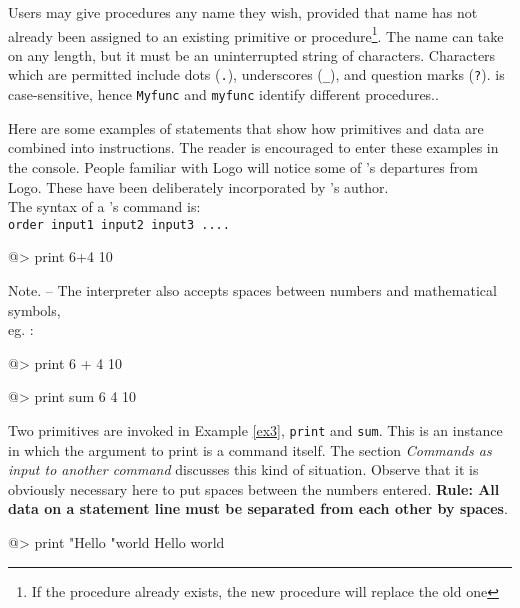 Users may give procedures any name they wish, provided that name has not already been assigned to an existing primitive or procedure\footnote{If the procedure already exists, the new procedure will replace the old one}. The name can take on any length, but it must be an uninterrupted string of characters.  Characters which are permitted include dots (\verb+.+), underscores (\verb+_+), and question marks (\verb+?+). \squirrel is case-sensitive, hence \verb+Myfunc+ and \verb+myfunc+ identify different procedures.. 
 
Here are some examples of \squirrel statements that show how primitives and data are combined into instructions. The reader is encouraged to enter these examples in the console.  People familiar with Logo will notice some of \squirrel's departures from Logo.  These have been deliberately incorporated by \squirrel's author.\\

The syntax of a \squirrel's command is:\\

{\tt order input1 input2 input3 ....}\\

\begin{verbatimtab}
@> print 6+4
10
\end{verbatimtab}

Note. -- The interpreter also accepts spaces between numbers and mathematical symbols,\\ eg. :

\begin{verbatimtab}
@> print 6 + 4
10
\end{verbatimtab}

\begin{verbatimtab}
@> print sum 6 4
10
\end{verbatimtab}
 
Two primitives are invoked in Example \ref{ex3}, \verb+print+ and \verb+sum+.  This is an instance in which the argument to print is a command itself.  The section {\em Commands as input to another command} discusses this kind of situation. Observe that it is obviously necessary here to put spaces between the numbers entered.  {\bf Rule: All data on a statement line must be separated from each other by spaces}.
 
\begin{verbatimtab}
@> print "Hello "world
Hello world
\end{verbatimtab}
 

